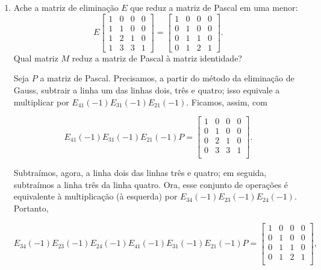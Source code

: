 \documentclass[leqno]{article}
\begin{document}
\begin{enumerate}

\item Ache a matriz de eliminação $E$ que reduz a matriz de Pascal em uma menor:
$$E \begin{bmatrix} 1 & 0 & 0 & 0 \\
1 & 1 & 0 & 0 \\
1 & 2 & 1 & 0 \\
1 & 3 & 3 & 1
\end{bmatrix} = \begin{bmatrix} 1 & 0 & 0 & 0 \\
0 & 1 & 0 & 0 \\
0 & 1 & 1 & 0 \\
0 & 1 & 2 & 1 
\end{bmatrix}.$$
Qual matriz $M$ reduz a matriz de Pascal à matriz identidade?

\begin{sol} 
	Seja $P$ a matriz de Pascal. Precisamos, a partir do método da eliminação de Gauss, subtrair a linha um das linhas dois, três e quatro; isso equivale a multiplicar por $E_{41}(-1)E_{31}(-1)E_{21}(-1)$. Ficamos, assim, com 

	\begin{equation*} 
		E_{41}(-1)E_{31}(-1)E_{21}(-1)P = 
		\begin{bmatrix} 
			1 & 0 & 0 & 0 \\ 
			0 & 1 & 0 & 0 \\ 
			0 & 2 & 1 & 0 \\ 
			0 & 3 & 3 & 1 \\ 
		\end{bmatrix}.  
	\end{equation*} 
	
	\noindent Subtraímos, agora, a linha dois das linhas três e quatro; em seguida, subtraímos a linha três da linha quatro. Ora, esse conjunto de operações é equivalente à multiplicação (à esquerda) por $E_{34}(-1)E_{23}(-1)E_{24}(-1)$. Portanto, 

	\begin{equation*} 
		E_{34}(-1)E_{23}(-1)E_{24}(-1)E_{41}(-1)E_{31}(-1)E_{21}(-1)P = 
	\begin{bmatrix} 
		1 & 0 & 0 & 0 \\ 
		0 & 1 & 0 & 0 \\ 
		0 & 1 & 1 & 0 \\ 
		0 & 1 & 2 & 1 \\ 
	\end{bmatrix}, 
	\end{equation*} 


\end{sol}
\end{enumerate}
\end{document}
